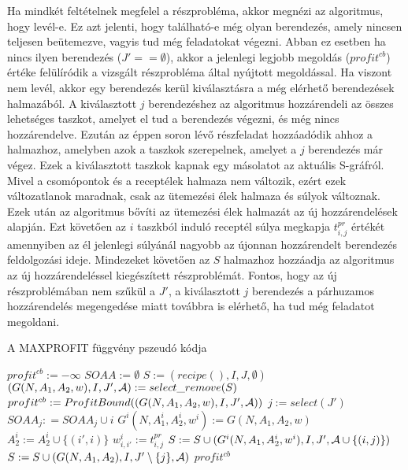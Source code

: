 Ha mindkét feltételnek megfelel a részprobléma, akkor megnézi az algoritmus, hogy levél-e.
Ez azt jelenti, hogy található-e még olyan berendezés, amely nincsen teljesen beütemezve, vagyis tud még feladatokat végezni.
Abban ez esetben ha nincs ilyen berendezés ($J'== \emptyset$), akkor a jelenlegi legjobb megoldás ($profit^{cb}$) értéke felülíródik a vizsgált részprobléma által nyújtott megoldással.
Ha viszont nem levél, akkor egy berendezés kerül kiválasztásra a még elérhető berendezések halmazából.
A kiválasztott $j$ berendezéshez az algoritmus hozzárendeli az összes lehetséges taszkot, amelyet el tud a berendezés végezni, és még nincs hozzárendelve.
Ezután az éppen soron lévő részfeladat hozzáadódik ahhoz a halmazhoz, amelyben azok a taszkok szerepelnek, amelyet a $j$ berendezés már végez.
Ezek a kiválasztott taszkok kapnak egy másolatot az aktuális S-gráfról.
Mivel a csomópontok és a receptélek halmaza nem változik, ezért ezek változatlanok maradnak, csak az ütemezési élek halmaza és súlyok változnak.
Ezek után az algoritmus bővíti az ütemezési élek halmazát az új hozzárendelések alapján.
Ezt követően az $i$ taszkból induló receptél súlya megkapja $t^{pr}_{i,j}$ értékét amennyiben az él jelenlegi súlyánál nagyobb az újonnan hozzárendelt berendezés feldolgozási ideje.
Mindezeket követően az $S$ halmazhoz hozzáadja az algoritmus az új hozzárendeléssel kiegészített részproblémát.
Fontos, hogy az új részproblémában nem szűkül a $J'$, a kiválasztott $j$ berendezés a párhuzamos hozzárendelés megengedése miatt továbbra is elérhető, ha tud még feladatot megoldani. 

\begin{algorithm}[H]
\caption{A MAXPROFIT függvény pszeudó kódja}
\label{parhuzamos}
\begin{algorithmic}[1]
	\State $profit^{cb}:= -\infty$
	\State $SOAA:= \emptyset$
	\State $S:= {(recipe(),I,J,\emptyset)}$
		\State $(G(N,A_1,A_2,w),I,J',{\cal A}):= select\_remove(S)$		
					\State $profit^{cb}:=ProfitBound((G(N,A_1,A_2,w),I,J',{\cal A}))$
				\Else
					\State $j:=select(J')$
						\State $SOAA_j: = SOAA_j\cup i$
						\State $G^i(N,A_1^i,A_2^i,w^i):= G(N,A_1,A_2,w)$
							\State $A_2^i:= A_2^i \cup \{(i',i)\}$				
						\EndFor
								\State $w_{i,i'}^i:= t_{i,j}^{pr}$
							\EndIf
						\EndFor
						\State $S:= S \cup (G^i(N,A_1,A_2^i,w^i),I,J',{\cal A} \cup \{(i,j)\})$
					\EndFor
						\State $S:= S \cup (G(N,A_1,A_2),I,J'\setminus\{j\},{\cal A})$
					\EndIf					
				\EndIf
			\EndIf
		\EndIf
	\EndWhile
	\State \Return $profit^{cb}$
\EndProcedure
\end{algorithmic}
\end{algorithm}

